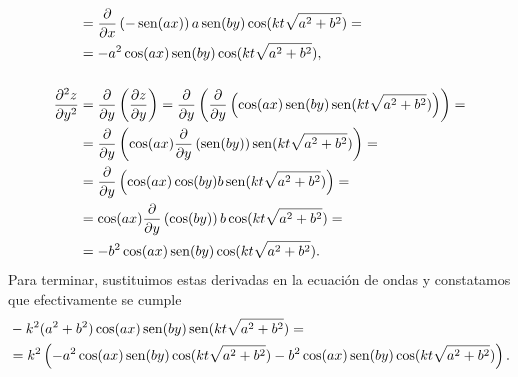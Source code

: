 {\begin{align*}
&= \frac{\partial}{\partial x}\left(-\operatorname{sen}(ax)\right)a\operatorname{sen}(by)\cos(kt\sqrt{a^2+b^2}) =\\
&= -a^2\cos(ax)\operatorname{sen}(by)\cos(kt\sqrt{a^2+b^2}),\\[.5cm]
\frac{\partial^2 z}{\partial y^2} &=
\frac{\partial}{\partial y}\left(\frac{\partial z}{\partial y}\right)  
= \frac{\partial}{\partial y}\left(\frac{\partial}{\partial y}\left(\cos(ax)\operatorname{sen}(by)\operatorname{sen}(kt\sqrt{a^2+b^2})\right)\right)= \\
&= \frac{\partial}{\partial y}\left(\cos(ax)\frac{\partial}{\partial y}\left(\operatorname{sen}(by)\right)\operatorname{sen}(kt\sqrt{a^2+b^2})\right)=\\ 
&= \frac{\partial}{\partial y}\left(\cos(ax)\cos(by)b\operatorname{sen}(kt\sqrt{a^2+b^2})\right)=\\
&= \cos(ax)\frac{\partial}{\partial y}\left(\cos(by)\right)b\cos(kt\sqrt{a^2+b^2}) =\\
&= -b^2\cos(ax)\operatorname{sen}(by)\cos(kt\sqrt{a^2+b^2}).
\end{align*}
Para terminar, sustituimos estas derivadas en la ecuación de ondas y constatamos que efectivamente se cumple
\begin{align*}
& -k^2(a^2+b^2)\cos(ax)\operatorname{sen}(by)\operatorname{sen}(kt\sqrt{a^2+b^2}) =\\
&= k^2\left(-a^2\cos(ax)\operatorname{sen}(by)\cos(kt\sqrt{a^2+b^2})-b^2\cos(ax)\operatorname{sen}(by)\cos(kt\sqrt{a^2+b^2})\right).
\end{align*}
}


